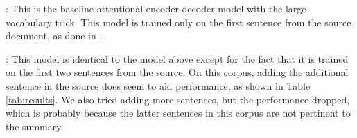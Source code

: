 
: This is the baseline attentional encoder-decoder model with the large vocabulary trick. This model is trained only on the first sentence from the source document, as done in .

: This model is identical to the model above except for the fact that it is trained on the first two sentences from the source. On this corpus, adding the additional sentence in the source does seem to aid performance, as shown in Table \ref{tab:results}. We also tried adding more sentences, but the performance dropped, which is probably because the latter sentences in this corpus are not pertinent to the summary.


